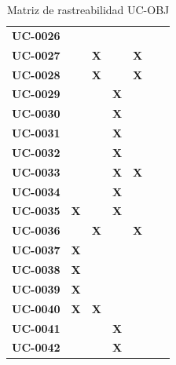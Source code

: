 \begin{table}[H]
\begin{tabular}{p{1.5cm}p{0.5cm}p{0.5cm}p{0.5cm}p{0.5cm}p{0.5cm}p{0.5cm}}
\textbf{UC-0026} &  &  &  &  &  &  \\
\textbf{UC-0027} &  & \textbf{X} &  & \textbf{X} &  &  \\
\textbf{UC-0028} &  & \textbf{X} &  & \textbf{X} &  &  \\
\textbf{UC-0029} &  &  & \textbf{X} &  &  &  \\
\textbf{UC-0030} &  &  & \textbf{X} &  &  &  \\
\textbf{UC-0031} &  &  & \textbf{X} &  &  &  \\
\textbf{UC-0032} &  &  & \textbf{X} &  &  &  \\
\textbf{UC-0033} &  &  & \textbf{X} & \textbf{X} &  &  \\
\textbf{UC-0034} &  &  & \textbf{X} &  &  &  \\
\textbf{UC-0035} & \textbf{X} &  & \textbf{X} &  &  &  \\
\textbf{UC-0036} &  & \textbf{X} &  & \textbf{X} &  &  \\
\textbf{UC-0037} & \textbf{X} &  &  &  &  &  \\
\textbf{UC-0038} & \textbf{X} &  &  &  &  &  \\
\textbf{UC-0039} & \textbf{X} &  &  &  &  &  \\
\textbf{UC-0040} & \textbf{X} & \textbf{X} &  &  &  &  \\
\textbf{UC-0041} &  &  & \textbf{X} &  &  &  \\
\textbf{UC-0042} &  &  & \textbf{X} &  &  &  \\
\hline
\end{tabular}
\caption{Matriz de rastreabilidad UC-OBJ}
\label{fig:matriz-uc-obj}
\end{table}
